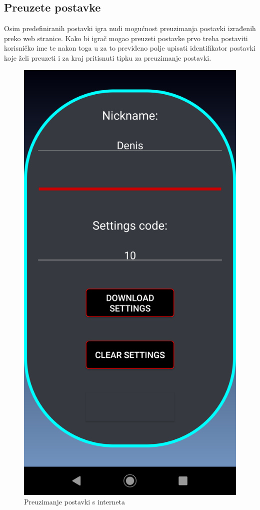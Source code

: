 \documentclass[times, utf8, zavrsni, numeric]{fer}
\begin{document}
		\subsection{Preuzete postavke}
		Osim predefiniranih postavki igra nudi mogućnost preuzimanja postavki izrađenih preko web stranice. Kako bi igrač mogao preuzeti postavke prvo treba postaviti korisničko ime te nakon toga u za to previđeno polje upisati identifikator postavki
		koje želi preuzeti i za kraj pritisnuti tipku za preuzimanje postavki. 
	
		\begin{figure}[H]
			\includegraphics[scale = 0.2]{"slike/downloadsettings.png"} 
			\centering
			\caption{Preuzimanje postavki s interneta}
			\label{fig:preuzimanjepostavki}
		\end{figure}
		
\end{document}
